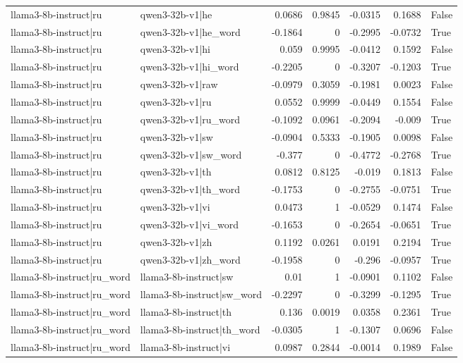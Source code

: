 \begin{table}
\begin{tabular}{l l r r r r l}
llama3-8b-instruct|ru & qwen3-32b-v1|he & 0.0686 & 0.9845 & -0.0315 & 0.1688 & False \\
llama3-8b-instruct|ru & qwen3-32b-v1|he_word & -0.1864 & 0 & -0.2995 & -0.0732 & True \\
llama3-8b-instruct|ru & qwen3-32b-v1|hi & 0.059 & 0.9995 & -0.0412 & 0.1592 & False \\
llama3-8b-instruct|ru & qwen3-32b-v1|hi_word & -0.2205 & 0 & -0.3207 & -0.1203 & True \\
llama3-8b-instruct|ru & qwen3-32b-v1|raw & -0.0979 & 0.3059 & -0.1981 & 0.0023 & False \\
llama3-8b-instruct|ru & qwen3-32b-v1|ru & 0.0552 & 0.9999 & -0.0449 & 0.1554 & False \\
llama3-8b-instruct|ru & qwen3-32b-v1|ru_word & -0.1092 & 0.0961 & -0.2094 & -0.009 & True \\
llama3-8b-instruct|ru & qwen3-32b-v1|sw & -0.0904 & 0.5333 & -0.1905 & 0.0098 & False \\
llama3-8b-instruct|ru & qwen3-32b-v1|sw_word & -0.377 & 0 & -0.4772 & -0.2768 & True \\
llama3-8b-instruct|ru & qwen3-32b-v1|th & 0.0812 & 0.8125 & -0.019 & 0.1813 & False \\
llama3-8b-instruct|ru & qwen3-32b-v1|th_word & -0.1753 & 0 & -0.2755 & -0.0751 & True \\
llama3-8b-instruct|ru & qwen3-32b-v1|vi & 0.0473 & 1 & -0.0529 & 0.1474 & False \\
llama3-8b-instruct|ru & qwen3-32b-v1|vi_word & -0.1653 & 0 & -0.2654 & -0.0651 & True \\
llama3-8b-instruct|ru & qwen3-32b-v1|zh & 0.1192 & 0.0261 & 0.0191 & 0.2194 & True \\
llama3-8b-instruct|ru & qwen3-32b-v1|zh_word & -0.1958 & 0 & -0.296 & -0.0957 & True \\
llama3-8b-instruct|ru_word & llama3-8b-instruct|sw & 0.01 & 1 & -0.0901 & 0.1102 & False \\
llama3-8b-instruct|ru_word & llama3-8b-instruct|sw_word & -0.2297 & 0 & -0.3299 & -0.1295 & True \\
llama3-8b-instruct|ru_word & llama3-8b-instruct|th & 0.136 & 0.0019 & 0.0358 & 0.2361 & True \\
llama3-8b-instruct|ru_word & llama3-8b-instruct|th_word & -0.0305 & 1 & -0.1307 & 0.0696 & False \\
llama3-8b-instruct|ru_word & llama3-8b-instruct|vi & 0.0987 & 0.2844 & -0.0014 & 0.1989 & False \\

\end{tabular}
\end{table}
